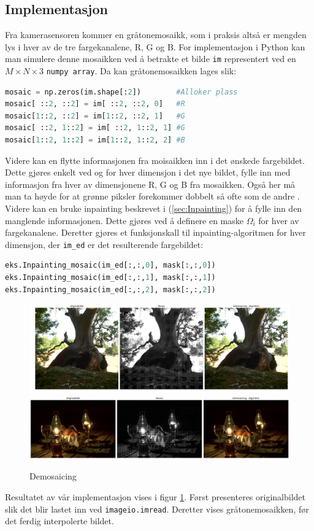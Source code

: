 \subsection{Implementasjon}
Fra kamerasensoren kommer en gråtonemosaikk, som i praksis altså er mengden lys i hver av de tre fargekanalene, R, G og B. For implementasjon i Python kan man simulere denne mosaikken ved å betrakte et bilde \texttt{im} representert ved en $M\times N \times 3$ \texttt{numpy array}. Da kan gråtonemosaikken lages slik:
\begin{lstlisting}[language=Python]
mosaic = np.zeros(im.shape[:2])        #Alloker plass
mosaic[ ::2, ::2] = im[ ::2, ::2, 0]   #R 
mosaic[1::2, ::2] = im[1::2, ::2, 1]   #G
mosaic[ ::2, 1::2] = im[ ::2, 1::2, 1] #G
mosaic[1::2, 1::2] = im[1::2, 1::2, 2] #B
\end{lstlisting}
Videre kan en flytte informasjonen fra moisaikken inn i det ønskede fargebildet. Dette gjøres enkelt ved og for hver dimensjon i det nye bildet, fylle inn med informasjon fra hver av dimensjonene R, G og B fra mosaikken. Også her må man ta høyde for at grønne piksler forekommer dobbelt så ofte som de andre \cite{Demosaic38:online}. Videre kan en bruke inpainting beskrevet i (\ref{sec:Inpainting}) for å fylle inn den manglende informasjonen. Dette gjøres ved å definere en maske $\Omega_i$ for hver av fargekanalene. Deretter gjøres et funksjonskall til inpainting-algoritmen for hver dimensjon, der \texttt{im\_ed} er det resulterende fargebildet:
\begin{lstlisting}[language=Python]
eks.Inpainting_mosaic(im_ed[:,:,0], mask[:,:,0])
eks.Inpainting_mosaic(im_ed[:,:,1], mask[:,:,1])
eks.Inpainting_mosaic(im_ed[:,:,2], mask[:,:,2])
\end{lstlisting}

\begin{figure}
\begin{center}
    \includegraphics[width=1\columnwidth]{bilder/tree_mosaic.png} 
    \includegraphics[width=1\columnwidth]{bilder/stillLife_mosaic.png}
    \caption{Demosaicing \label{Figur 5}}
\end{center}
\end{figure}
Resultatet av vår implementasjon vises i figur \ref{Figur 5}. Først presenteres originalbildet slik det blir lastet inn ved \texttt{imageio.imread}. Deretter vises gråtonemosaikken, før det ferdig interpolerte bildet. 

